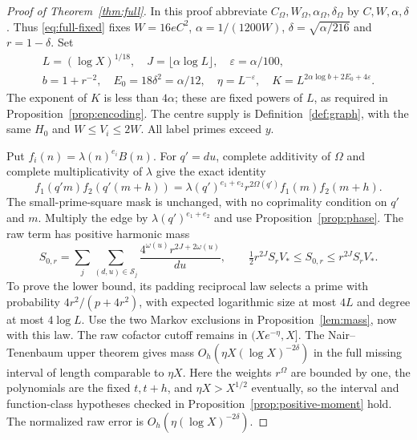 \documentclass[11pt]{article}
\theoremstyle{definition}
\theoremstyle{remark}
\numberwithin{equation}{section}
\newcommand{\eps}{\varepsilon}
\begin{document}
\begin{proof}[Proof of Theorem~\ref{thm:full}]
In this proof abbreviate $C_\Omega,W_\Omega,\alpha_\Omega,\delta_\Omega$ by $C,W,\alpha,\delta$.
Thus \eqref{eq:full-fixed} fixes $W=16eC^2$, $\alpha=1/(1200W)$, $\delta=\sqrt{\alpha/216}$ and $r=1-\delta$.
Set
\begin{equation}\label{eq:full-parameters}
\begin{gathered}
 L=(\log X)^{1/18},\quad J=\lfloor\alpha\log L\rfloor,\quad\eps=\alpha/100,\\
 b=1+r^{-2},\quad E_0=18\delta^2=\alpha/12,\quad
 \eta=L^{-\eps},\quad K=L^{2\alpha\log b+2E_0+4\eps}.
\end{gathered}
\end{equation}
The exponent of $K$ is less than $4\alpha$; these are fixed powers of $L$, as required in
Proposition~\ref{prop:encoding}. The centre supply is Definition~\ref{def:graph}, with the same $H_0$ and
$W\le V_i\le2W$. All label primes exceed $y$.

Put $f_i(n)=\lambda(n)^{e_i}B(n)$. For $q'=du$, complete additivity of $\Omega$ and complete multiplicativity of
$\lambda$ give the exact identity
\begin{equation}\label{eq:full-dilation}
 f_1(q'm)f_2(q'(m+h))
 =\lambda(q')^{e_1+e_2}r^{2\Omega(q')}f_1(m)f_2(m+h).
\end{equation}
The small-prime-square mask is unchanged, with no coprimality condition on $q'$ and $m$.
Multiply the edge by $\lambda(q')^{e_1+e_2}$ and use Proposition~\ref{prop:phase}.
The raw term has positive harmonic mass
\begin{equation}\label{eq:full-raw-mass}
 S_{0,r}=\sum_j\sum_{(d,u)\in\mathcal S_j}\frac{4^{\omega(u)}r^{2J+2\omega(u)}}{du},\qquad
 \tfrac12r^{2J}S_rV_*\le S_{0,r}\le r^{2J}S_rV_*.
\end{equation}
To prove the lower bound, its padding reciprocal law selects a prime with probability
$4r^2/(p+4r^2)$, with expected logarithmic size at most $4L$ and degree at most $4\log L$.
Use the two Markov exclusions in Proposition~\ref{lem:mass}, now with this law.
The raw cofactor cutoff remains in $(Xe^{-\eta},X]$.
The Nair--Tenenbaum upper theorem gives mass
$O_h(\eta X(\log X)^{-2\delta})$ in the full missing interval of length comparable to $\eta X$.
Here the weights $r^{\Omega}$ are bounded by one, the polynomials are the fixed $t,t+h$, and
$\eta X>X^{1/2}$ eventually, so the interval and function-class hypotheses checked in
Proposition~\ref{prop:positive-moment} hold. The normalized raw error is
$O_h(\eta(\log X)^{-2\delta})$.


\end{proof}
\end{document}
